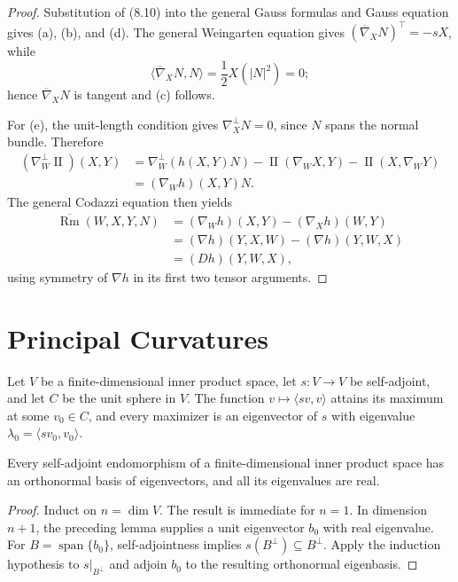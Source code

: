 \begin{proof}
\sketch Substitution of (8.10) into the general Gauss formulas and Gauss
equation gives (a), (b), and (d). The general Weingarten equation gives
$(\overline\nabla_XN)^\top=-sX$, while
\[
\langle\overline\nabla_XN,N\rangle
=\frac12X(|N|^2)=0;
\]
hence $\overline\nabla_XN$ is tangent and (c) follows.

For (e), the unit-length condition gives
$\nabla_X^\perp N=0$, since $N$ spans the normal bundle. Therefore
\begin{align*}
(\nabla_W^\perp\operatorname{II})(X,Y)
&=\nabla_W^\perp(h(X,Y)N)
  -\operatorname{II}(\nabla_WX,Y)
  -\operatorname{II}(X,\nabla_WY)\\
&=(\nabla_Wh)(X,Y)N.
\end{align*}
The general Codazzi equation then yields
\begin{align*}
\overline{\operatorname{Rm}}(W,X,Y,N)
&=(\nabla_Wh)(X,Y)-(\nabla_Xh)(W,Y)\\
&=(\nabla h)(Y,X,W)-(\nabla h)(Y,W,X)\\
&=(Dh)(Y,W,X),
\end{align*}
using symmetry of $\nabla h$ in its first two tensor arguments.
\end{proof}

\section{Principal Curvatures}

\begin{lemma}
\label{lem:self-adjoint-eigenvector-extremum}
Let $V$ be a finite-dimensional inner product space, let
$s\colon V\to V$ be self-adjoint, and let $C$ be the unit sphere in $V$.
The function $v\mapsto\langle sv,v\rangle$ attains its maximum at some
$v_0\in C$, and every maximizer is an eigenvector of $s$ with eigenvalue
$\lambda_0=\langle sv_0,v_0\rangle$.
\end{lemma}

\begin{proposition}
\label{prop:finite-dimensional-spectral-theorem}

Every self-adjoint endomorphism of a finite-dimensional inner product space
has an orthonormal basis of eigenvectors, and all its eigenvalues are real.
\end{proposition}

\begin{proof}
\sketch Induct on $n=\dim V$. The result is immediate for $n=1$. In dimension
$n+1$, the preceding lemma supplies a unit eigenvector $b_0$ with real
eigenvalue. For $B=\operatorname{span}\{b_0\}$, self-adjointness implies
$s(B^\perp)\subseteq B^\perp$. Apply the induction hypothesis to
$s|_{B^\perp}$ and adjoin $b_0$ to the resulting orthonormal eigenbasis.
\end{proof}

